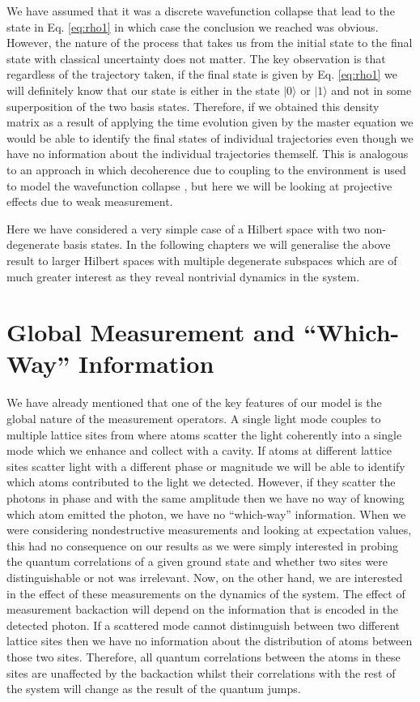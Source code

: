We have assumed that it was a discrete wavefunction collapse that lead
to the state in Eq. \eqref{eq:rho1} in which case the conclusion we
reached was obvious. However, the nature of the process that takes us
from the initial state to the final state with classical uncertainty
does not matter. The key observation is that regardless of the
trajectory taken, if the final state is given by Eq. \eqref{eq:rho1}
we will definitely know that our state is either in the state
$| 0 \rangle$ or $| 1 \rangle$ and not in some superposition of the
two basis states. Therefore, if we obtained this density matrix as a
result of applying the time evolution given by the master equation we
would be able to identify the final states of individual trajectories
even though we have no information about the individual trajectories
themself. This is analogous to an approach in which decoherence due to
coupling to the environment is used to model the wavefunction collapse
\cite{zurek2002}, but here we will be looking at projective effects
due to weak measurement.

Here we have considered a very simple case of a Hilbert space with two
non-degenerate basis states. In the following chapters we will
generalise the above result to larger Hilbert spaces with multiple
degenerate subspaces which are of much greater interest as they reveal
nontrivial dynamics in the system.

\section{Global Measurement and ``Which-Way'' Information}
\label{sec:modes}

We have already mentioned that one of the key features of our model is
the global nature of the measurement operators. A single light mode
couples to multiple lattice sites from where atoms scatter the light
coherently into a single mode which we enhance and collect with a
cavity. If atoms at different lattice sites scatter light with a
different phase or magnitude we will be able to identify which atoms
contributed to the light we detected. However, if they scatter the
photons in phase and with the same amplitude then we have no way of
knowing which atom emitted the photon, we have no ``which-way''
information. When we were considering nondestructive measurements and
looking at expectation values, this had no consequence on our results
as we were simply interested in probing the quantum correlations of a
given ground state and whether two sites were distinguishable or not
was irrelevant. Now, on the other hand, we are interested in the
effect of these measurements on the dynamics of the system. The effect
of measurement backaction will depend on the information that is
encoded in the detected photon. If a scattered mode cannot
distinuguish between two different lattice sites then we have no
information about the distribution of atoms between those two sites.
Therefore, all quantum correlations between the atoms in these sites
are unaffected by the backaction whilst their correlations with the
rest of the system will change as the result of the quantum jumps.

